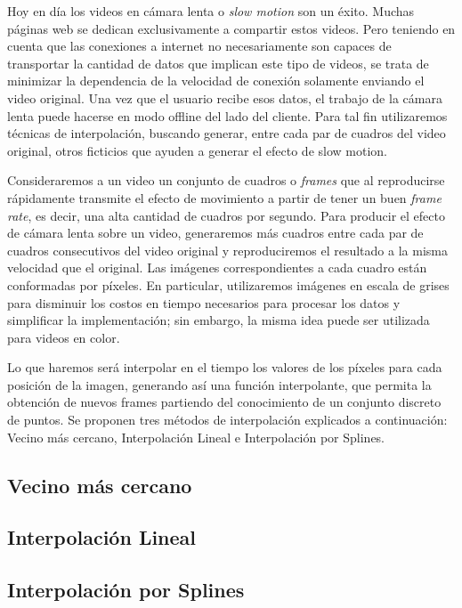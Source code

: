 \par Hoy en día los videos en cámara lenta o \textit{slow motion }son un éxito. Muchas páginas web se dedican exclusivamente a compartir estos videos. Pero teniendo en cuenta que las conexiones a internet no necesariamente son capaces de transportar la cantidad de datos que implican este tipo de videos, se trata de minimizar la dependencia de la velocidad de conexión solamente enviando el video original. Una vez que el usuario recibe esos datos, el trabajo de la cámara lenta puede hacerse en modo offline del lado del cliente. Para tal fin utilizaremos técnicas de interpolación, buscando generar, entre cada par de cuadros del video original, otros ficticios que ayuden a generar el efecto de slow motion.

\par Consideraremos a un video un conjunto de cuadros o \textit{frames} que al reproducirse rápidamente transmite el efecto de movimiento a partir de tener un buen \textit{frame rate}, es decir, una alta cantidad de cuadros por segundo. Para producir el efecto de cámara lenta sobre un video, generaremos más cuadros entre cada par de cuadros consecutivos del video original y reproduciremos el resultado a la misma velocidad que el original. Las im\'agenes correspondientes a cada cuadro est\'an conformadas por p\'ixeles. En particular, utilizaremos im\'agenes en escala de grises para disminuir los costos en tiempo necesarios para procesar los datos y simplificar la implementaci\'on; sin embargo, la misma idea puede ser utilizada para videos en color. 

\par Lo que haremos será interpolar en el tiempo los valores de los p\'ixeles para cada posición de la imagen, generando así una función interpolante, que permita la obtención de nuevos frames partiendo del conocimiento de un conjunto discreto de puntos. Se proponen tres métodos de interpolación explicados a continuación: Vecino más cercano, Interpolación Lineal e Interpolación por Splines.

\subsection{Vecino más cercano}



\subsection{Interpolación Lineal}



\newpage

\subsection{Interpolación por Splines}

